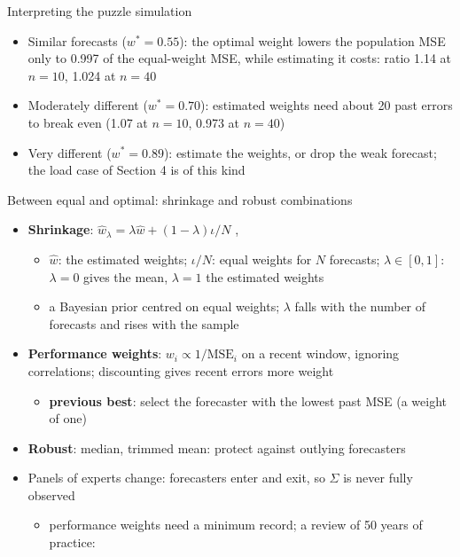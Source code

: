 \begin{frame}{Interpreting the puzzle simulation}
\itemsize{\small}
\begin{itemize}
    \item Similar forecasts ($w^* = 0.55$): the optimal weight lowers the population MSE only to 0.997 of the equal-weight MSE, while estimating it costs: ratio 1.14 at $n = 10$, 1.024 at $n = 40$
    \item Moderately different ($w^* = 0.70$): estimated weights need about 20 past errors to break even (1.07 at $n = 10$, 0.973 at $n = 40$)
    \item Very different ($w^* = 0.89$): estimate the weights, or drop the weak forecast; the load case of Section 4 is of this kind
\end{itemize}
\end{frame}

\begin{frame}{Between equal and optimal: shrinkage and robust combinations}
\itemsize{\small}
\begin{itemize}
    \item \textbf{Shrinkage}: $\hat w_\lambda = \lambda\hat w + (1 - \lambda)\iota/N$ , 
    \begin{itemize}
        \item $\hat w$: the estimated weights; $\iota/N$: equal weights for $N$ forecasts; $\lambda \in [0,1]$: $\lambda = 0$ gives the mean, $\lambda = 1$ the estimated weights
        \item a Bayesian prior centred on equal weights; $\lambda$ falls with the number of forecasts and rises with the sample
    \end{itemize}
    \item \textbf{Performance weights}: $w_i \propto 1/\mathrm{MSE}_i$ on a recent window, ignoring correlations; discounting gives recent errors more weight
    \begin{itemize}
        \item \textbf{previous best}: select the forecaster with the lowest past MSE (a weight of one)
    \end{itemize}
    \item \textbf{Robust}: median, trimmed mean: protect against outlying forecasters
    \item Panels of experts change: forecasters enter and exit, so $\Sigma$ is never fully observed 
    \begin{itemize}
        \item performance weights need a minimum record; a review of 50 years of practice: 
    \end{itemize}
\end{itemize}
\end{frame}

